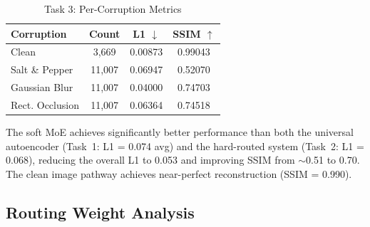 \documentclass[conference]{IEEEtran}
\begin{document}
\begin{table}[H]
\centering
\caption{Task 3: Per-Corruption Metrics}
\label{tab:task3_corruption}
\begin{tabular}{lccc}
\toprule
\textbf{Corruption} & \textbf{Count} & \textbf{L1 $\downarrow$} & \textbf{SSIM $\uparrow$} \\
\midrule
Clean & 3,669 & 0.00873 & 0.99043 \\
Salt \& Pepper & 11,007 & 0.06947 & 0.52070 \\
Gaussian Blur & 11,007 & 0.04000 & 0.74703 \\
Rect. Occlusion & 11,007 & 0.06364 & 0.74518 \\
\bottomrule
\end{tabular}
\end{table}

The soft MoE achieves significantly better performance than both the universal autoencoder (Task~1: L1 = 0.074 avg) and the hard-routed system (Task~2: L1 = 0.068), reducing the overall L1 to 0.053 and improving SSIM from $\sim$0.51 to 0.70. The clean image pathway achieves near-perfect reconstruction (SSIM = 0.990).

\subsection{Routing Weight Analysis}

\begin{table}[H]
\centering
\caption{Task 3: Average Routing Weights by Corruption Type and Severity}
\label{tab:task3_routing}
\end{table}
\end{document}
